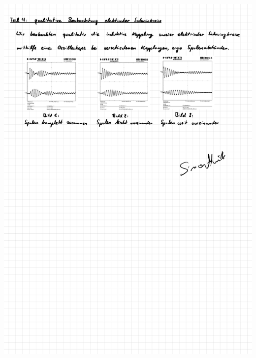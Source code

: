 \documentclass{article}
\begin{document}
\includegraphics[width=\textwidth]{graphics/mess3.jpg}
\newpage

\addtocounter{table}{3}
\end{document}
